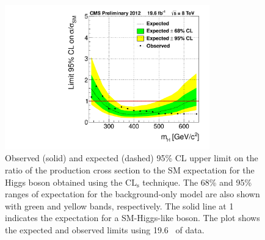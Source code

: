 \begin{figure}[htbp]
\centerline{
 \includegraphics[width=0.79\textwidth]{plots/limit_observed_all-btag_ll.pdf}
}
\caption{
Observed (solid) and expected (dashed) 95\% CL upper limit on the ratio of the production cross section to the SM expectation for the Higgs boson obtained using the $\mathrm{CL_s}$ technique. The 68\% and 95\% ranges of expectation for the background-only model are also shown with green and yellow bands, respectively.  The solid line at 1 indicates the expectation for a SM-Higgs-like boson. The plot shows the expected and observed limits using 19.6~\fbinv{} of data.
}
\label{fig:limit5fb}
\end{figure}

